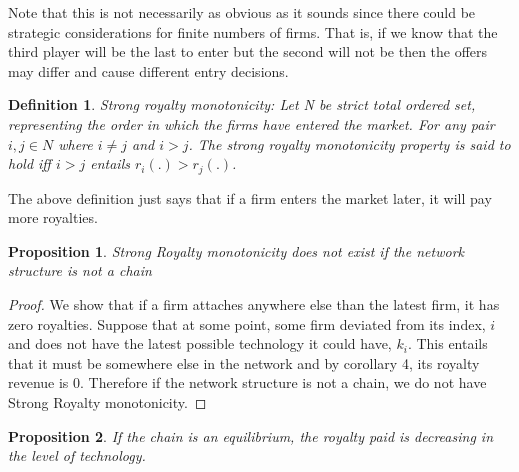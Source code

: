 \documentclass{article}
\newtheorem{proposition}{Proposition}
\newtheorem{definition}{Definition}
\begin{document}
Note that this is not necessarily as obvious as it sounds since there could be strategic considerations for finite numbers of firms. That is, if we know that the third player will be the last to enter but the second will not be then the offers may differ and cause different entry decisions. 

\begin{definition}{Strong royalty monotonicity:}
Let N be strict total ordered set, representing the order in which the firms have entered the market. For any pair$i,j \in N$ where $i\neq j$ and $i>j$. The strong royalty monotonicity property is said to hold iff $i>j$ entails $r_i(.)>r_j(.)$. 
\end{definition}

The above definition just says that if a firm enters the market later, it will pay more royalties. 

\begin{proposition}
Strong Royalty monotonicity does not exist if the network structure is not a chain
\end{proposition}

\begin{proof}
We show that if a firm attaches anywhere else than the latest firm, it has zero royalties. 
Suppose that at some point, some firm deviated from its index, $i$ and does not have the latest possible technology it could have, $k_i$. This entails that it must be somewhere else in the network and by corollary 4, its royalty revenue is 0. Therefore if the network structure is not a chain, we do not have Strong Royalty monotonicity. 
\end{proof}

\begin{proposition}
If the chain is an equilibrium, the royalty paid is decreasing in the level of technology. 
\end{proposition}
\end{document}
